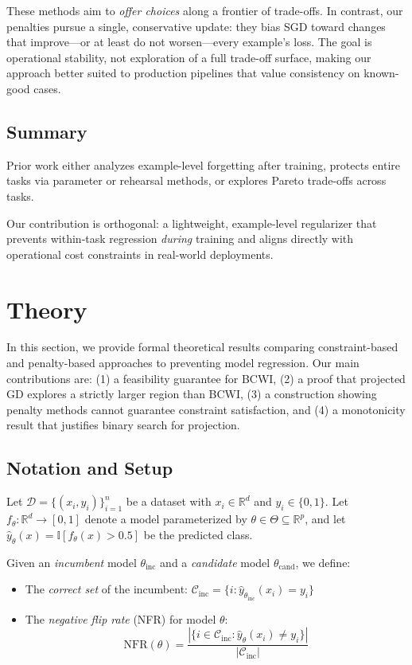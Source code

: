 \documentclass[12pt, letterpaper]{article}
\theoremstyle{remark}
\begin{document}
These methods aim to \emph{offer choices} along a frontier of trade-offs.
In contrast, our penalties pursue a single, conservative update: they bias SGD toward changes that improve—or at least do not worsen—every example's loss.
The goal is operational stability, not exploration of a full trade-off surface, making our approach better suited to production pipelines that value consistency on known-good cases.

\subsection{Summary}
Prior work either analyzes example-level forgetting after training,
protects entire tasks via parameter or rehearsal methods, or explores Pareto
trade-offs across tasks.

Our contribution is orthogonal: a lightweight, example-level regularizer that prevents within-task regression \emph{during} training and aligns directly with operational cost constraints in real-world deployments.

\section{Theory}\label{sec:theory}

In this section, we provide formal theoretical results comparing constraint-based and penalty-based approaches to preventing model regression. Our main contributions are: (1) a feasibility guarantee for BCWI, (2) a proof that projected GD explores a strictly larger region than BCWI, (3) a construction showing penalty methods cannot guarantee constraint satisfaction, and (4) a monotonicity result that justifies binary search for projection.

\subsection{Notation and Setup}

Let $\mathcal{D} = \{(x_i, y_i)\}_{i=1}^n$ be a dataset with $x_i \in \mathbb{R}^d$ and $y_i \in \{0,1\}$. Let $f_\theta: \mathbb{R}^d \to [0,1]$ denote a model parameterized by $\theta \in \Theta \subseteq \mathbb{R}^p$, and let $\hat{y}_\theta(x) = \mathbb{I}[f_\theta(x) > 0.5]$ be the predicted class.

Given an \emph{incumbent} model $\theta_{\mathrm{inc}}$ and a \emph{candidate} model $\theta_{\mathrm{cand}}$, we define:

\begin{itemize}
\item The \emph{correct set} of the incumbent: $\mathcal{C}_{\mathrm{inc}} = \{i : \hat{y}_{\theta_{\mathrm{inc}}}(x_i) = y_i\}$
\item The \emph{negative flip rate} (NFR) for model $\theta$:
\[
\mathrm{NFR}(\theta) = \frac{|\{i \in \mathcal{C}_{\mathrm{inc}} : \hat{y}_\theta(x_i) \neq y_i\}|}{|\mathcal{C}_{\mathrm{inc}}|}
\]
\end{itemize}
\end{document}

